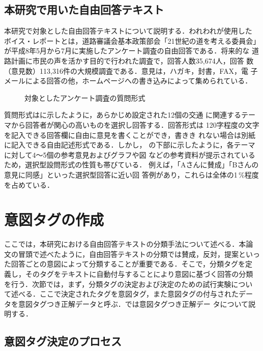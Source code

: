 \subsection{本研究で用いた自由回答テキスト}

本研究で対象とした自由回答テキストについて説明する．われわれが使用した
ボイス・レポートとは，道路審議会基本政策部会「21世紀の道を考える委員会」
が平成8年5月から7月に実施したアンケート調査の自由回答である．将来的な
道路計画に市民の声を活かす目的で行われた調査で，回答人数35,674人，回答
数（意見数）113,316件の大規模調査である．意見は，ハガキ，封書，FAX，電
子メールによる回答の他，ホームページへの書き込みによって集められている．

\begin{figure}[t]
\begin{center}
\leavevmode
{}
\caption{対象としたアンケート調査の質問形式}
\label{fig:figure2}
\end{center}
\end{figure}

質問形式はに示したように，あらかじめ設定された12個の交通
に関連するテーマから回答者が関心の高いものを選択し回答する．回答形式は
120字程度の文字を記入できる回答欄に自由に意見を書くことができ，書きき
れない場合は別紙に記入できる自由記述形式である．しかし， 
の下部に示したように，各テーマに対して4〜5個の参考意見およびグラフや図
などの参考資料が提示されているため，選択型設問形式の性質も帯びている．
例えば，「Aさんに賛成」「Bさんの意見に同感」といった選択型回答に近い回
答例があり，これらは全体の1\,\%程度を占めている．

\section{意図タグの作成}

ここでは，本研究における自由回答テキストの分類手法について述べる．本論
文の冒頭で述べたように，自由回答テキストの分類では賛成，反対，提案といっ
た回答ごとの意図によって分類することが重要である．そこで，分類タグを定
義し，そのタグをテキストに自動付与することにより意図に基づく回答の分類
を行う．次節では，まず，分類タグの決定および決定のための試行実験につい
て述べる．ここで決定されたタグを意図タグ，また意図タグの付与されたデー
タを意図タグつき正解データと呼ぶ．では意図タグつき正解デー
タについて説明する．

\subsection{意図タグ決定のプロセス}
\label{ssec:process}

